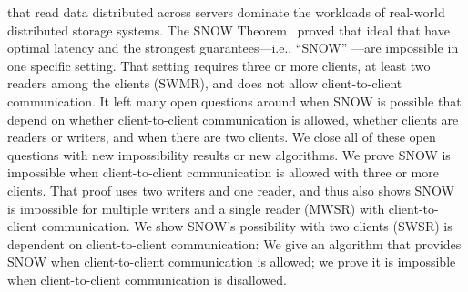 \rots{} that read data distributed across servers dominate the workloads of real-world distributed storage systems.
The SNOW Theorem~\cite{SNOW2016} proved that ideal \rots{} that have optimal latency and the strongest guarantees---i.e., ``SNOW'' \rots{}---are impossible in one specific setting. That setting requires three or more clients, at least two readers among the clients (SWMR), and does not allow client-to-client communication.
It left many open questions around when SNOW is possible that depend on whether client-to-client communication is allowed, whether clients are readers or writers, and when there are two clients.
We close all of these open questions with new impossibility results or new algorithms.
We prove SNOW is impossible when client-to-client communication is allowed with three or more clients.
That proof uses two writers and one reader, and thus also shows SNOW is impossible for multiple writers and a single reader (MWSR) with client-to-client communication.
We show SNOW's possibility with two clients (SWSR) is dependent on client-to-client communication:
We give an algorithm that provides SNOW when client-to-client communication is allowed;
we prove it is impossible when client-to-client communication is disallowed.






